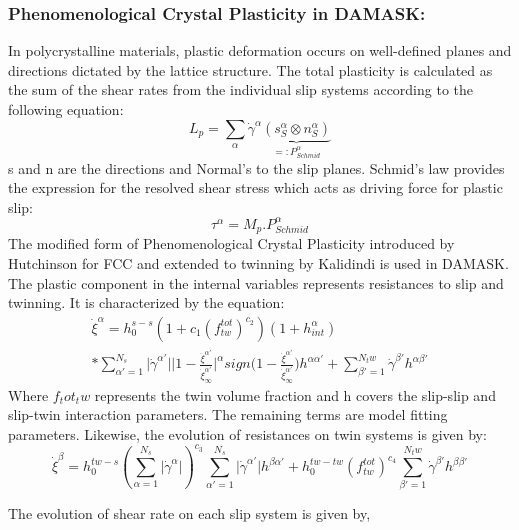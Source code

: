 \subsubsection{Phenomenological Crystal Plasticity in DAMASK:}
In polycrystalline materials, plastic deformation occurs on well-defined planes and directions dictated by the lattice structure. The total plasticity is calculated as the sum of the shear rates from the individual slip systems according to the following equation:
\begin{equation}
    L_p = \sum_{\alpha} \dot{\gamma} ^\alpha \underbrace{(s_{S}^{\alpha} \otimes n_{S}^{\alpha})}_{=:P_{Schmid}^{\alpha}}
\end{equation}
s and n are the directions and Normal's to the slip planes. Schmid's law provides the expression for the resolved shear stress which acts as driving force for plastic slip:
\begin{equation}
 \tau^\alpha=M_p . P_{Schmid}^{\alpha}
\end{equation}
The modified form of Phenomenological Crystal Plasticity introduced by Hutchinson for FCC and extended to twinning by Kalidindi is used in DAMASK. The plastic component in the internal variables represents resistances to slip and twinning. It is characterized by the equation:
\begin{multline}
\dot{\xi}^{\alpha}=h_{0}^{s-s}(1+c_1(f_{tw}^{tot})^{c_2})(1+h_{int}^{\alpha}) \\ *
\sum_{\alpha'=1}^{N_s} \lvert\dot{\gamma}^{\alpha'}\rvert \bigg|1-\frac{\dot{\xi}^{\alpha'}}{\dot{\xi}^{\alpha'}_{\infty}}\bigg|^{\alpha} sign\bigg(1-\frac{\dot{\xi}^{\alpha'}}{\dot{\xi}^{\alpha'}_{\infty}}\bigg)h^{\alpha\alpha'}+\sum_{\beta'=1}^{N_tw} \dot{\gamma}^{\beta'}h^{\alpha\beta'}
\end{multline}
Where $f_tot_tw$ represents the twin volume fraction and h covers the slip-slip and slip-twin interaction parameters. The remaining terms are model fitting parameters. Likewise, the evolution of resistances on twin systems is given by:
\begin{equation}
\dot{\xi}^{\beta}=h_{0}^{tw-s}(\sum_{\alpha=1}^{N_s}\lvert\dot{\gamma}^{\alpha}\rvert)^{c_3} \sum_{\alpha'=1}^{N_s}\lvert\dot{\gamma}^{\alpha'}\rvert h^{\beta\alpha'} + h_{0}^{tw-tw} (f_{tw}^{tot})^{c_4}  \sum_{\beta'=1}^{N_tw} \dot{\gamma}^{\beta'}h^{\beta\beta'}
\end{equation}

The evolution of shear rate on each slip system is given by,

